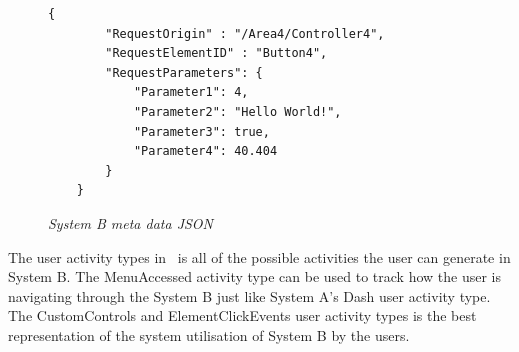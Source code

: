 \begin{figure}[!htb]
	\centering
	\begin{lstlisting}[style=json] 
	{
		"RequestOrigin" : "/Area4/Controller4",
		"RequestElementID" : "Button4",
		"RequestParameters": {
			"Parameter1": 4,
			"Parameter2": "Hello World!",
			"Parameter3": true,
			"Parameter4": 40.404
		}
	}
	\end{lstlisting}
	\caption[System B meta data JSON]
	{\textit{System B meta data JSON}}\label{fig:CH2_SystemBMetaData}
\end{figure}

\clearpage

The user activity types in~ is all of the possible activities the user can generate in System B. The MenuAccessed activity type can be used to track how the user is navigating through the System B just like System A's Dash user activity type. The CustomControls and ElementClickEvents user activity types is the best representation of the system utilisation of System B by the users.

